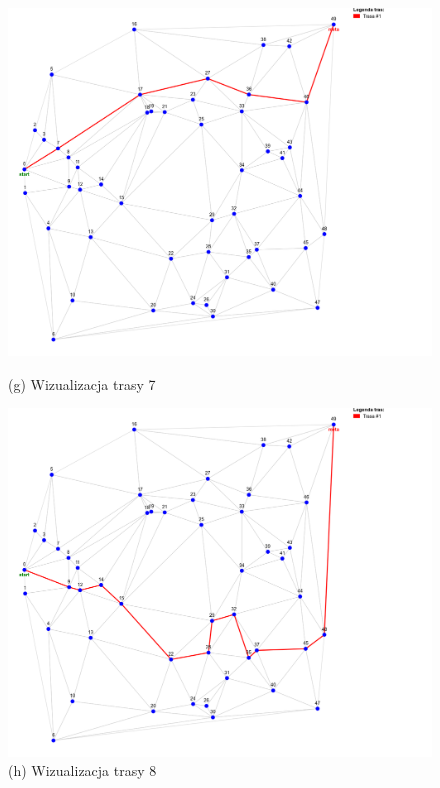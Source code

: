 \documentclass{article}
\begin{document}
\clearpage



\begin{figure}[H]
    \centering
    \begin{minipage}[b]{0.48\linewidth}
        \includegraphics[width=\linewidth]{7.png}
        \caption*{(g) Wizualizacja trasy 7}
    \end{minipage}
    \hfill
    \begin{minipage}[b]{0.48\linewidth}
        \includegraphics[width=\linewidth]{8.png}
        \caption*{(h) Wizualizacja trasy 8}
    \end{minipage}
    \vspace{0.5em}


\end{figure}
\end{document}
